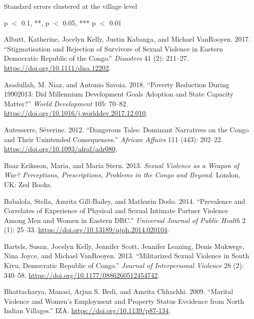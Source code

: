 \documentclass[
]{article}
\newlength{\cslhangindent}
\newenvironment{CSLReferences}[2] %
 {\begin{list}{}{%
  \setlength{\itemindent}{0pt}
  \setlength{\leftmargin}{0pt}
  \setlength{\parsep}{0pt}
  \ifodd #1
   \setlength{\leftmargin}{\cslhangindent}
   \setlength{\itemindent}{-1\cslhangindent}
  \fi
  \setlength{\itemsep}{#2\baselineskip}}}
 {\end{list}}
\begin{document}
Standard errors clustered at the village level

p \(<\) 0.1, **, p \(<\) 0.05, *** p \(<\) 0.01

\label{refs}
\begin{CSLReferences}{1}{0}
Albutt, Katherine, Jocelyn Kelly, Justin Kabanga, and Michael VanRooyen.
2017. {``Stigmatisation and Rejection of Survivors of Sexual Violence in
Eastern {Democratic Republic} of the {Congo}.''} \emph{Disasters} 41
(2): 211--27. \url{https://doi.org/10.1111/disa.12202}.

Asadullah, M. Niaz, and Antonio Savoia. 2018. {``Poverty Reduction
During 1990{\textendash}2013: {Did} Millennium Development Goals
Adoption and State Capacity Matter?''} \emph{World Development} 105:
70--82. \url{https://doi.org/10.1016/j.worlddev.2017.12.010}.

Autesserre, Séverine. 2012. {``Dangerous Tales: {Dominant} Narratives on
the {Congo} and Their Unintended Consequences.''} \emph{African Affairs}
111 (443): 202--22. \url{https://doi.org/10.1093/afraf/adr080}.

Baaz Eriksson, Maria, and Maria Stern. 2013. \emph{Sexual Violence as a
Weapon of War? {Perceptions}, Prescriptions, Problems in the {Congo} and
Beyond}. {London, UK}: {Zed Books}.

Babalola, Stella, Amrita Gill-Bailey, and Mathurin Dodo. 2014.
{``Prevalence and {Correlates} of {Experience} of {Physical} and {Sexual
Intimate Partner Violence} Among {Men} and {Women} in {Eastern DRC}.''}
\emph{Universal Journal of Public Health} 2 (1): 25--33.
\url{https://doi.org/10.13189/ujph.2014.020104}.

Bartels, Susan, Jocelyn Kelly, Jennifer Scott, Jennifer Leaning, Denis
Mukwege, Nina Joyce, and Michael VanRooyen. 2013. {``Militarized {Sexual
Violence} in {South Kivu}, {Democratic Republic} of {Congo}.''}
\emph{Journal of Interpersonal Violence} 28 (2): 340--58.
\url{https://doi.org/10.1177/0886260512454742}.

Bhattacharya, Manasi, Arjun S. Bedi, and Amrita Chhachhi. 2009.
{``Marital {Violence} and {Women}'s {Employment} and {Property Status
Evcidence} from {North Indian Villages}.''} {IZA}.
\url{https://doi.org/10.1139/p87-134}.


\end{CSLReferences}
\end{document}

